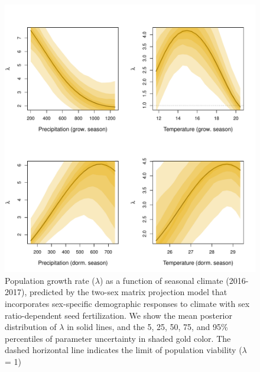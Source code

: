 \documentclass[12pt]{article}
\begin{document}
\begin{figure}[h!]
  \begin{center}
    \includegraphics[width=0.95\linewidth]{Figures/lambda_CI.pdf}
  \caption{Population growth rate ($\lambda$) as a function of seasonal climate (2016-2017), predicted by the two-sex matrix projection model that incorporates sex-specific demographic responses to climate with sex ratio-dependent seed fertilization.
We show the mean posterior distribution of $\lambda$ in solid lines, and the 5, 25, 50, 75, and 95\% percentiles of parameter uncertainty in shaded gold color.
The dashed horizontal line indicates the limit of population viability ($\lambda$ = 1)}
  \label{Sup:lambda2sex}
  \end{center}
\end{figure}
\end{document}
